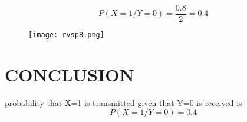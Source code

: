 \documentclass[journal,12pt,twocolumn]{IEEEtran}
\begin{document}
\begin{equation}
       P(X=1/Y=0)=\frac{0.8}{2}=0.4
\end{equation}

\begin{figure}
   \centering
   \texttt{[image: rvsp8.png]}
\end{figure}

\section{\textbf{CONCLUSION}}
probability that X=1 is transmitted given that Y=0 is received is
\begin{equation}
    P(X=1/Y=0)=0.4
\end{equation}
\end{document}
